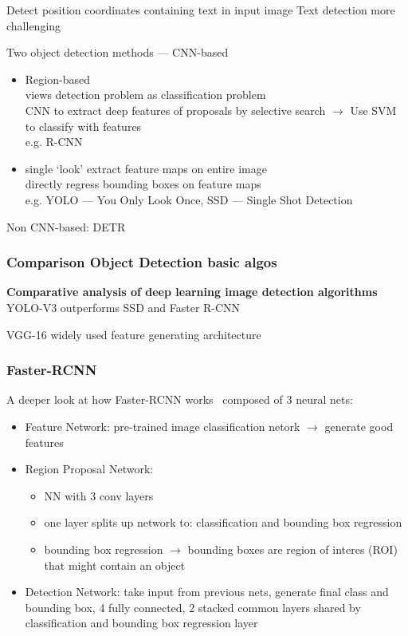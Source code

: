 Detect position coordinates containing text in input image
Text detection more challenging

Two object detection methods --- CNN-based
\begin{itemize}
    \item Region-based \\
        views detection problem as classification problem\\
        CNN to extract deep features of proposals by selective search $\rightarrow$  Use SVM to
            classify with features\\
        e.g. R-CNN
    \item  single `look'
        extract feature maps on entire image\\
        directly regress bounding boxes on feature maps\\
        e.g. YOLO --- You Only Look Once, SSD --- Single Shot Detection
\end{itemize}
Non CNN-based: DETR

\subsubsection*{Comparison Object Detection basic algos}
\textbf{Comparative analysis of deep learning image detection
algorithms}~\cite{srivastava_comparative_2021}
YOLO-V3 outperforms SSD and Faster R-CNN

VGG-16 widely used feature generating architecture

\subsubsection*{Faster-RCNN}
A deeper look at how Faster-RCNN works~\cite{goswami_deeper_2018}
composed of 3 neural nets:
\begin{itemize}
    \item Feature Network: pre-trained image classification netork $\rightarrow$ generate good features
    \item Region Proposal Network:
        \begin{itemize}
            \item NN with 3 conv layers
            \item one layer splits up network to: classification and bounding box regression
            \item bounding box regression $\rightarrow$ bounding boxes are region of interes (ROI)
                that might contain an object
        \end{itemize}
    \item Detection Network: take input from previous nets, generate final class and bounding box,
        4 fully connected, 2 stacked common layers shared by classification and bounding box regression
        layer \end{itemize}

